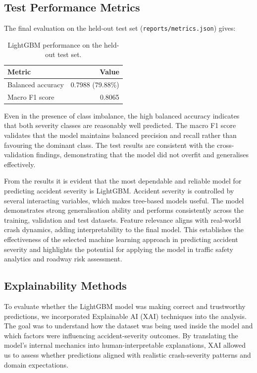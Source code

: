 \documentclass[11pt,a4paper]{article}
\begin{document}
\subsection{Test Performance Metrics}

The final evaluation on the held-out test set
(\texttt{reports/metrics.json}) gives:

\begin{table}[H]
  \centering
  \caption{LightGBM performance on the held-out test set.}
  \label{tab:test}
  \begin{tabular}{@{}l r@{}}
  \toprule
  \textbf{Metric} & \textbf{Value} \\
  \midrule
  Balanced accuracy & 0.7988 \;(79.88\%) \\
  Macro F1 score    & 0.8065 \\
  \bottomrule
  \end{tabular}
\end{table}

Even in the presence of class imbalance, the high balanced accuracy indicates that both severity
classes are reasonably well predicted. The macro F1 score validates that the model maintains
balanced precision and recall rather than favouring the dominant class. The test results are
consistent with the cross-validation findings, demonstrating that the model did not overfit and
generalises effectively.

From the results it is evident that the most dependable and reliable model for predicting accident
severity is LightGBM. Accident severity is controlled by several interacting variables, which makes
tree-based models useful. The model demonstrates strong generalisation ability and performs
consistently across the training, validation and test datasets. Feature relevance aligns with
real-world crash dynamics, adding interpretability to the final model. This establishes the
effectiveness of the selected machine learning approach in predicting accident severity and
highlights the potential for applying the model in traffic safety analytics and roadway risk
assessment.

\subsection{Explainability Methods}

To evaluate whether the LightGBM model was making correct and trustworthy predictions, we
incorporated Explainable AI (XAI) techniques into the analysis. The goal was to understand how the
dataset was being used inside the model and which factors were influencing accident-severity
outcomes. By translating the model's internal mechanics into human-interpretable explanations, XAI
allowed us to assess whether predictions aligned with realistic crash-severity patterns and domain
expectations.
\end{document}

